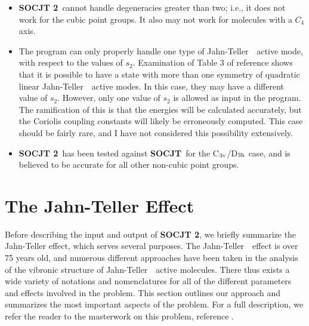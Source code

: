 \documentclass{article}
\newcommand{\JT}{Jahn-Teller\ }
\newcommand{\socjttwo}{{\bf SOCJT 2}}
\newcommand{\socjt}{{\bf SOCJT}}
\newenvironment{bulletlist}{%
  \renewcommand{\labelitemi}{$\bullet $}%
     \begin{itemize}}{\end{itemize}}
\begin{document}
\begin{bulletlist}
\item \socjttwo\ cannot handle degeneracies greater than two; i.e., it
  does not work for the cubic point groups. It also may not
  work for molecules with a $C_4$ axis. %
\item The program can only properly handle one type of \JT\ active
  mode, with respect to the values of $s_2$. Examination of
  Table 3 of reference  shows that it is possible to have
  a state with more than one symmetry of quadratic linear \JT\ active
  modes. In this case, they may have a different value of
  $s_2$. However, only one value of $s_2$ is allowed as input in the
  program. The ramification of this is that the energies will be
  calculated accurately, but the Coriolis coupling constants will
  likely be erroneously computed. This case should be fairly rare, and
  I have not considered this possibility extensively.
\item \socjttwo\ has been tested against \socjt\ for the C$_{3\textnormal{v}}$/D$_{3\textnormal{h}}$ case, and
  is believed to be accurate for all other non-cubic point groups.
\end{bulletlist}

\section{The Jahn-Teller Effect} \label{section:jt}

Before describing the input and output of \socjttwo, we briefly summarize
the Jahn-Teller effect, which serves several purposes. The \JT\ effect
is over 75 years old, and numerous different approaches have been
taken in the analysis of the vibronic structure of \JT\ active
molecules. There thus exists a wide variety of notations and
nomenclatures for all of the different parameters and effects involved
in the problem. This section outlines our approach and summarizes the
most important aspects of the problem. For a full description, we
refer the reader to the masterwork on this problem, reference
.
\end{document}
